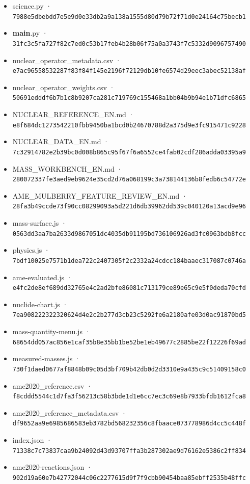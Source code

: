 \documentclass[
  11pt,
  letterpaper,
]{article}
\begin{document}
\begin{itemize}
\item
  science.py ·
  \texttt{7988e5dbebdd7e5e9d0e33db2a9a138a1555d80d79b72f71d0e24164c75becb1}
\item
  \textbf{main}.py ·
  \texttt{31fc3c5fa727f82c7ed0c53b17feb4b28b06f75a0a3743f7c5332d9096757490}
\item
  nuclear\_operator\_metadata.csv ·
  \texttt{e7ac96558532287f83f84f145e2196f72129db10fe6574d29eec3abec52138af}
\item
  nuclear\_operator\_weights.csv ·
  \texttt{50691edddf6b7b1c8b9207ca281c719769c155468a1bb04b9b94e1b71dfc6865}
\item
  NUCLEAR\_REFERENCE\_EN.md ·
  \texttt{e8f684dc1273542210fbb9450ba1bcd0b24670788d2a375d9e3fc915471c9228}
\item
  NUCLEAR\_DATA\_EN.md ·
  \texttt{7c32914782e2b39bc0d008b865c95f67f6a6552ce4fab02cdf286adda03395a9}
\item
  MASS\_WORKBENCH\_EN.md ·
  \texttt{280072337fe3aed9eb9624e35cd2d76a068199c3a738144136b8fedb6c54772e}
\item
  AME\_MULBERRY\_FEATURE\_REVIEW\_EN.md ·
  \texttt{28fa3b49ccde73f90cc08299093a5d221d6db39962dd539c040120a13acd9e96}
\item
  mass-surface.js ·
  \texttt{0563dd3aa7ba2633d9867051dc4035db91195bd736106926ad3fc0963bdb8fcc}
\item
  physics.js ·
  \texttt{7bdf10025e7571b1dea722c2407305f2c2332a24cdcc184baaec317087c0746a}
\item
  ame-evaluated.js ·
  \texttt{e4fc2de8ef689dd32765e4c2ad2bfe86081c713179ce89e65c9e5f0deda70cfd}
\item
  nuclide-chart.js ·
  \texttt{7ea908222322320624d4e2c2b277d3cb23c5292fe6a2180afe03d0ac91870bd5}
\item
  mass-quantity-menu.js ·
  \texttt{68654dd057ac856e1caf35b8e35bb1be52be1eb49677c2885be22f12226f69ad}
\item
  measured-masses.js ·
  \texttt{730f1daed0677af8848b09c05d3bf709b42db0d2d3310e9a435c9c51409158c0}
\item
  ame2020\_reference.csv ·
  \texttt{f8cddd5544c1d7fa3f56213c58b3bde1d1e6cc7ec3c69e8b7933bfdb1612fca8}
\item
  ame2020\_reference\_metadata.csv ·
  \texttt{df9652aa9e6985686583eb3782bd568232356c8fbaace073778986d4cc5c448f}
\item
  index.json ·
  \texttt{71338c7c73837caa9b24092d43d93707ffa3b287302ae9d76162e5386c2ff834}
\item
  ame2020-reactions.json ·
  \texttt{902d19a60e7b42772044c06c2277615d9f7f9cbb90454baa85ebff2535b48ffc}

\end{itemize}
\end{document}
